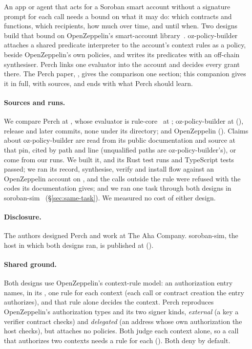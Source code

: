 An app or agent that acts for a Soroban smart account without a signature prompt
for each call needs a bound on what it may do: which contracts and functions,
which recipients, how much over time, and until when. Two designs build that
bound on OpenZeppelin's smart-account library~\cite{oz-stellar-accounts}.
oz-policy-builder~\cite{oz-policy-builder} attaches a shared predicate
interpreter to the account's context rules as a policy, beside OpenZeppelin's own
policies, and writes its predicates with an off-chain synthesiser. Perch links
one evaluator into the account and decides every grant there. The Perch paper,
, gives the comparison one section; this companion gives it in
full, with sources, and ends with what Perch should learn.

\paragraph{Sources and runs.} We compare Perch at , whose
evaluator is rule-core~\cite{rule-core} at ;
oz-policy-builder at  (), release
 and  later commits, none under
its  directory; and OpenZeppelin 
 (). Claims about oz-policy-builder are
read from its public documentation and source at that pin, cited by path and
line (unqualified paths are oz-policy-builder's), or come from our runs. We built
it, and its  Rust test runs and 
TypeScript tests passed; we ran its record, synthesise, verify and install flow
against an OpenZeppelin  account on
, and the calls outside the rule were refused with the
codes its documentation gives; and we ran one task through both designs in
soroban-sim~\cite{soroban-sim} (\S\ref{sec:same-task}). We measured no cost of
either design.

\paragraph{Disclosure.} The authors designed Perch and work at The Aha Company.
soroban-sim, the host in which both designs ran, is published at
 ().

\paragraph{Shared ground.} Both designs use OpenZeppelin's context-rule model: an
authorization entry names, in its , one rule for each
context (each call or contract creation the entry authorizes), and that rule
alone decides the context. Perch reproduces OpenZeppelin's authorization types
and its two signer kinds, \emph{external} (a key a verifier contract checks) and
\emph{delegated} (an address whose own authorization the host checks), but
attaches no policies. Both judge each context alone, so a call that authorizes
two contexts needs a rule for each (). Both
deny by default.

